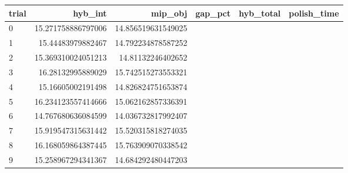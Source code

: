 \begin{tabular}{lrrrrr}
\hline
trial & hyb_int & mip_obj & gap_pct & hyb_total & polish_time \\ \hline
0 & 15.271758886797006 & 14.856519631549025 &  &  &  \\
1 & 15.44483979882467 & 14.792234878587252 &  &  &  \\
2 & 15.369310024051213 & 14.81132246402652 &  &  &  \\
3 & 16.28132995889029 & 15.742515273553321 &  &  &  \\
4 & 15.16605002191498 & 14.826824751653874 &  &  &  \\
5 & 16.234123557414666 & 15.062162857336391 &  &  &  \\
6 & 14.767680636084599 & 14.036732817992407 &  &  &  \\
7 & 15.919547315631442 & 15.520315818274035 &  &  &  \\
8 & 16.168059864387445 & 15.763909070338542 &  &  &  \\
9 & 15.258967294341367 & 14.684292480447203 &  &  &  \\
\hline
\end{tabular}
